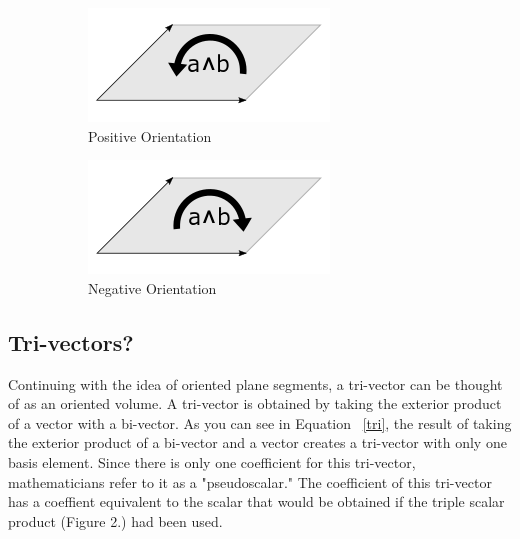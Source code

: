 \documentclass{amsart}
\begin{document}
			\begin{figure}[h]
				\centering
				\begin{subfigure}{0.45\linewidth}
					\includegraphics[width=\linewidth]{Fall_2017_Math_Research_Paper_Visuals/bivector_positive.png}
					\caption{Positive Orientation}
					\label{bivectorpositive}
				\end{subfigure}
				\begin{subfigure}{0.45\linewidth}
					\includegraphics[width=\linewidth]{Fall_2017_Math_Research_Paper_Visuals/bivector_negative.png}
					\caption{Negative Orientation}
					\label{bivectornegative}
				\end{subfigure}	
				\caption{}
				\label{bivectors}
			\end{figure}


		\subsection{Tri-vectors?}
			Continuing with the idea of oriented plane segments, a tri-vector can be thought of as an oriented volume. A tri-vector is obtained by taking the exterior product of a vector with a bi-vector. As you can see in Equation ~\ref{tri}, the result of taking the exterior product of a bi-vector and a vector creates a tri-vector with only one basis element. Since there is only one coefficient for this tri-vector, mathematicians refer to it as a "pseudoscalar." The coefficient of this tri-vector has a coeffient equivalent to the scalar that would be obtained if the triple scalar product (Figure 2.) had been used.
			
\end{document}
